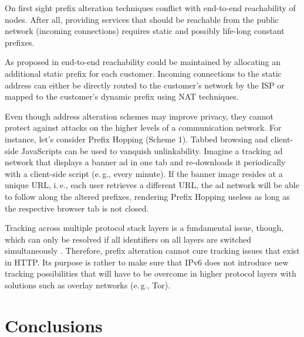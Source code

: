 \documentclass{easychair}
\begin{document}
On first sight prefix alteration techniques conflict with end-to-end reachability of nodes. After all, providing services that should be reachable from the public network (incoming connections) requires static and possibly life-long constant prefixes.

As proposed in \cite{Enlisting-ISPs} end-to-end reachability could be maintained by allocating an additional static prefix for each customer. Incoming connections to the static address can either be directly routed to the customer's network by the ISP or mapped to the customer's dynamic prefix using NAT techniques.



Even though address alteration schemes may improve privacy, they cannot protect against attacks on the higher levels of a communication network. For instance, let's consider Prefix Hopping (Scheme 1). Tabbed browsing and client-side JavaScripts can be used to vanquish unlinkability. Imagine a tracking ad network that displays a banner ad in one tab and re-downloads it periodically with a client-side script (e.\,g., every minute). If the banner image resides at a unique URL, i.\,e., each user retrieves a different URL,  the ad network will be able to follow along the altered prefixes, rendering Prefix Hopping useless as long as the respective browser tab is not closed.



Tracking across multiple protocol stack layers is a fundamental issue, though, which can only be resolved if all identifiers on all layers are switched simultaneously \cite{Lindqvist:2008:PPP:1456403.1456416}. Therefore, prefix alteration cannot cure tracking issues that exist in HTTP. Its purpose is rather to make sure that IPv6 does not introduce new tracking possibilities that will have to be overcome in higher protocol layers with solutions such as overlay networks (e.\,g., Tor).





















\section{Conclusions}
\end{document}
